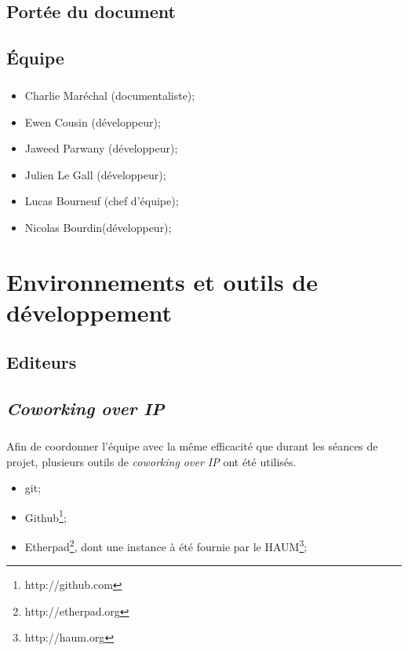 \section{Portée du document}
        \paragraph*{}


\section{Équipe}
        \paragraph*{}
        \begin{itemize}
                \item Charlie Maréchal (documentaliste);
                \item Ewen Cousin (développeur);
                \item Jaweed Parwany (développeur);
                \item Julien Le Gall (développeur);
                \item Lucas Bourneuf (chef d'équipe);
                \item Nicolas Bourdin(développeur);
        \end{itemize}




\chapter{Environnements et outils de développement} 


\section{Editeurs}
        \paragraph*{}

\section{\textit{Coworking over IP}}
        \paragraph*{}
	Afin de coordonner l'équipe avec la même efficacité que durant les séances de projet, plusieurs outils de \textit{coworking over IP} ont été utilisés.
        \begin{itemize}
                \item git;
                \item Github\footnote{http://github.com};
        	\item Etherpad\footnote{http://etherpad.org}, dont une instance à été fournie par le HAUM\footnote{http://haum.org};
        \end{itemize}






